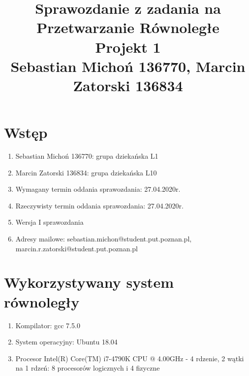 \documentclass[12pt]{article}
\begin{document}
\title{Sprawozdanie z zadania na Przetwarzanie Równoległe\\
\large Projekt 1\\
\large Sebastian Michoń 136770, Marcin Zatorski 136834}
\date{\vspace{-10ex}}
\maketitle

\section{Wstęp}
\begin {enumerate}
\item Sebastian Michoń 136770: grupa dziekańska L1
\item Marcin Zatorski 136834: grupa dziekańska L10
\item Wymagany termin oddania sprawozdania: 27.04.2020r.
\item Rzeczywisty termin oddania sprawozdania: 27.04.2020r.
\item Wersja I sprawozdania
\item Adresy mailowe: sebastian.michon@student.put.poznan.pl, marcin.r.zatorski@student.put.poznan.pl
\end {enumerate}

\section{Wykorzystywany system równoległy}
\begin {enumerate}
	\item Kompilator: gcc 7.5.0
	\item System operacyjny: Ubuntu 18.04
	\item Procesor Intel(R) Core(TM) i7-4790K CPU @ 4.00GHz - 4 rdzenie, 2 wątki na 1 rdzeń: 8 procesorów logicznych i 4 fizyczne
\end {enumerate}
\end{document}

